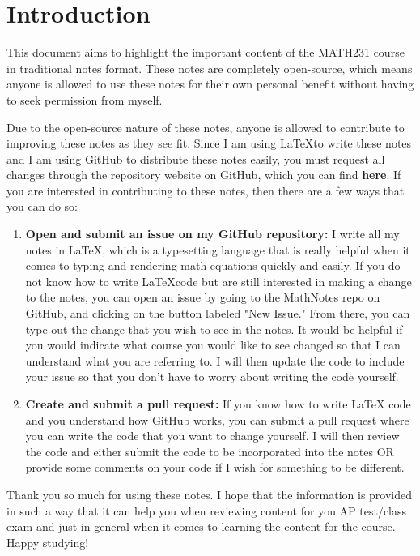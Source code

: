 \documentclass{package/notes}
\begin{document}
\chapter*{Introduction}

This document aims to highlight the important content of the MATH231 course in traditional notes format. These notes are completely open-source, which means anyone is allowed to use these notes for their own personal benefit without having to seek permission from myself. \newline

Due to the open-source nature of these notes, anyone is allowed to contribute to improving these notes as they see fit. Since I am using \LaTeX to write these notes and I am using GitHub to distribute these notes easily, you must request all changes through the repository website on GitHub, which you can find \textbf{here}. If you are interested in contributing to these notes, then there are a few ways that you can do so:\newline

\begin{enumerate}
	\item \textbf{Open and submit an issue on my GitHub repository:} I write all my notes in \LaTeX, which is a typesetting language that is really helpful when it comes to typing and rendering math equations quickly and easily. If you do not know how to write \LaTeX code but are still interested in making a change to the notes, you can open an issue by going to the MathNotes repo on GitHub, and clicking on the button labeled "New Issue." From there, you can type out the change that you wish to see in the notes. It would be helpful if you would indicate what course you would like to see changed so that I can understand what you are referring to. I will then update the code to include your issue so that you don't have to worry about writing the code yourself.
	\item \textbf{Create and submit a pull request:} If you know how to write LaTeX code and you understand how GitHub works, you can submit a pull request where you can write the code that you want to change yourself. I will then review the code and either submit the code to be incorporated into the notes OR provide some comments on your code if I wish for something to be different. 
\end{enumerate}

Thank you so much for using these notes. I hope that the information is provided in such a way that it can help you when reviewing content for you AP test/class exam and just in general when it comes to learning the content for the course. Happy studying!
\end{document}
